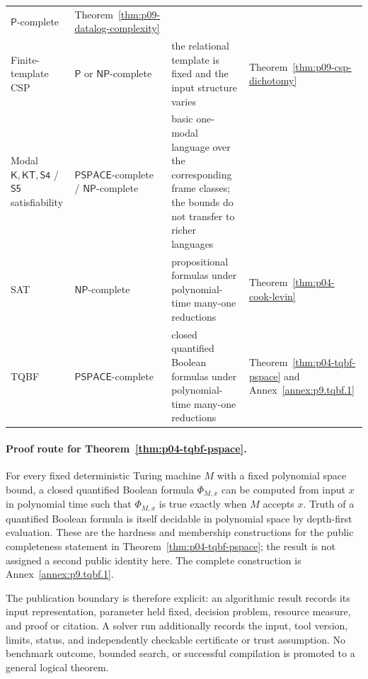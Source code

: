 \begin{longtable}{@{}p{}p{}p{}p{}@{}}
\(\mathsf P\)-complete & Theorem~\ref{thm:p09-datalog-complexity} \\
\addlinespace
Finite-template CSP & \(\mathsf P\) or \(\mathsf{NP}\)-complete &
the relational template is fixed and the input structure varies &
Theorem~\ref{thm:p09-csp-dichotomy} \\
\addlinespace
Modal \(\mathsf K,\mathsf{KT},\mathsf{S4}\) / \(\mathsf{S5}\) satisfiability &
\(\mathsf{PSPACE}\)-complete / \(\mathsf{NP}\)-complete &
basic one-modal language over the corresponding frame classes; the bounds do
not transfer to richer languages & \cite{Ladner1977} \\
\addlinespace
SAT & \(\mathsf{NP}\)-complete & propositional formulas under polynomial-time
many-one reductions & Theorem~\ref{thm:p04-cook-levin} \\
\addlinespace
TQBF & \(\mathsf{PSPACE}\)-complete & closed quantified Boolean formulas under
polynomial-time many-one reductions & Theorem~\ref{thm:p04-tqbf-pspace} and
Annex~\ref{annex:p9.tqbf.1} \\
\end{longtable}
\endgroup

\paragraph{Proof route for Theorem~\ref{thm:p04-tqbf-pspace}.}
For every fixed deterministic Turing machine \(M\) with a fixed polynomial
space bound, a closed
quantified Boolean formula \(\Phi_{M,x}\) can be computed from input \(x\) in
polynomial time such that \(\Phi_{M,x}\) is true exactly when \(M\) accepts
\(x\).  Truth of a quantified Boolean formula is itself decidable in polynomial
space by depth-first evaluation.  These are the hardness and membership
constructions for the public completeness statement in
Theorem~\ref{thm:p04-tqbf-pspace}; the result is not assigned a second public
identity here.  The complete construction is
Annex~\ref{annex:p9.tqbf.1}.




The publication boundary is therefore explicit: an algorithmic result records
its input representation, parameter held fixed, decision problem, resource
measure, and proof or citation. A solver run additionally records the input,
tool version, limits, status, and independently checkable certificate or trust
assumption. No benchmark outcome, bounded search, or successful compilation
is promoted to a general logical theorem.

